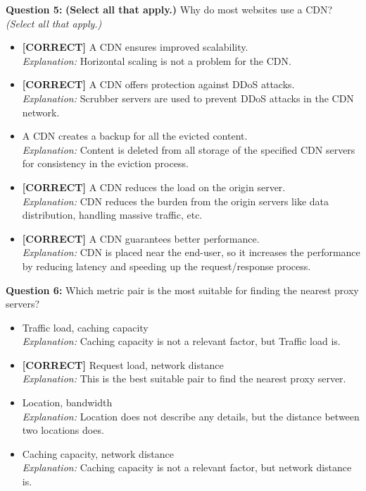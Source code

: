 \vspace{0.3cm}
\noindent
\textbf{Question 5:} \textbf{(Select all that apply.)} Why do most websites use a CDN?
\\
\textit{(Select all that apply.)}
\\[0.2cm]
\begin{itemize}
 \item \textbf{[CORRECT]} A CDN ensures improved scalability.
\\[0.1cm]
\textit{Explanation:} 
Horizontal scaling is not a problem for the CDN.
 \item \textbf{[CORRECT]} A CDN offers protection against DDoS attacks.
\\[0.1cm]
\textit{Explanation:} 
Scrubber servers are used to prevent DDoS attacks in the CDN network.
 \item A CDN creates a backup for all the evicted content.
\\[0.1cm]
\textit{Explanation:} 
Content is deleted from all storage of the specified CDN servers for consistency in the eviction process.
 \item \textbf{[CORRECT]} A CDN reduces the load on the origin server.
\\[0.1cm]
\textit{Explanation:} 
CDN reduces the burden from the origin servers like data distribution, handling massive traffic, etc.
 \item \textbf{[CORRECT]} A CDN guarantees better performance.
\\[0.1cm]
\textit{Explanation:} 
CDN is placed near the end-user, so it increases the performance by reducing latency and speeding up the request/response process.
\end{itemize}
\vspace{0.3cm}
\noindent
\textbf{Question 6:} Which metric pair is the most suitable for finding the nearest proxy servers?
\\[0.2cm]
\begin{itemize}
 \item Traffic load, caching capacity
\\[0.1cm]
\textit{Explanation:} 
Caching capacity is not a relevant factor, but Traffic load is.
 \item \textbf{[CORRECT]} Request load, network distance
\\[0.1cm]
\textit{Explanation:} 
This is the best suitable pair to find the nearest proxy server.
 \item Location, bandwidth
\\[0.1cm]
\textit{Explanation:} 
Location does not describe any details, but the distance between two locations does.
 \item Caching capacity, network distance
\\[0.1cm]
\textit{Explanation:} 
Caching capacity is not a relevant factor, but network distance is.
\end{itemize}


